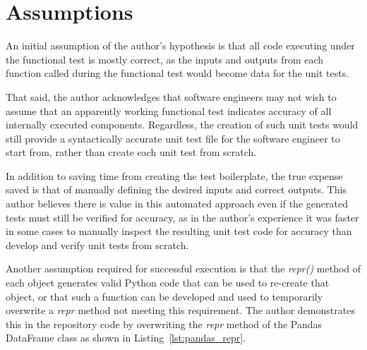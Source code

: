\section{Assumptions}\label{sec:assumptions}

An initial assumption of the author's hypothesis is that all code executing under the
functional test is mostly correct, as the inputs and outputs from each
function called during the functional test would become data for the
unit tests.  

That said, the author acknowledges that software engineers may not 
wish to assume that an apparently working functional test indicates accuracy of 
all internally executed components. Regardless, the creation of such unit 
tests would still provide a syntactically accurate unit
test file for the software engineer to start from, rather than create each unit
test from scratch.  

In addition to saving time from creating the test
boilerplate, the true expense saved is that of manually defining the desired
inputs and correct outputs.  This author believes there is value in this automated
approach even if the generated tests must still be verified for accuracy,
as in the author's experience it was faster in some cases to manually inspect 
the resulting unit test code for accuracy than develop and verify unit tests from scratch.

Another assumption required for successful execution is that the \textit{repr()} method
of each object generates valid Python code that can be used to re-create that
object, or that such a function can be developed and used to temporarily
overwrite a \textit{repr\(\)} method not meeting this requirement.  The author demonstrates
this in the repository code by overwriting the \textit{repr\(\)} method of the
Pandas DataFrame class as shown in Listing~\ref{lst:pandas_repr}.


